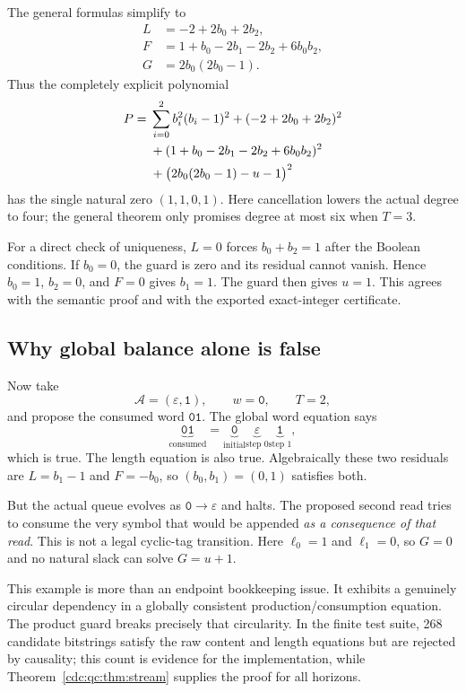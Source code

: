 \documentclass[11pt,a4paper]{article}
\theoremstyle{definition}
\theoremstyle{remark}
\newcommand{\eps}{\varepsilon}
\newcommand{\CT}{\mathcal A}
\newcommand{\word}[1]{\mathtt{#1}}
\begin{document}
The general formulas simplify to
\begin{align*}
 L&=-2+2b_0+2b_2,\\
 F&=1+b_0-2b_1-2b_2+6b_0b_2,\\
 G&=2b_0(2b_0-1).
\end{align*}
Thus the completely explicit polynomial
\begin{align}\label{cdc:qc:eq:small-example}
 P={}&\sum_{i=0}^{2}b_i^2(b_i-1)^2+(-2+2b_0+2b_2)^2\notag\\
 &+(1+b_0-2b_1-2b_2+6b_0b_2)^2\notag\\
 &+\bigl(2b_0(2b_0-1)-u-1\bigr)^2
\end{align}
has the single natural zero $(1,1,0,1)$. Here cancellation lowers the actual degree to four; the general theorem only promises degree at most six when $T=3$.

For a direct check of uniqueness, $L=0$ forces $b_0+b_2=1$ after the Boolean conditions. If $b_0=0$, the guard is zero and its residual cannot vanish. Hence $b_0=1$, $b_2=0$, and $F=0$ gives $b_1=1$. The guard then gives $u=1$. This agrees with the semantic proof and with the exported exact-integer certificate.

\subsection{Why global balance alone is false}
Now take
\[
 \CT=(\eps,\word{1}),\qquad w=\word{0},\qquad T=2,
\]
and propose the consumed word $\word{01}$. The global word equation says
\[
 \underbrace{\word{01}}_{\text{consumed}}
 =\underbrace{\word{0}}_{\text{initial}}
   \underbrace{\eps}_{\text{step 0}}
   \underbrace{\word{1}}_{\text{step 1}},
\]
which is true. The length equation is also true. Algebraically these two residuals are $L=b_1-1$ and $F=-b_0$, so $(b_0,b_1)=(0,1)$ satisfies both.

But the actual queue evolves as $\word{0}\to\eps$ and halts. The proposed second read tries to consume the very symbol that would be appended \emph{as a consequence of that read}. This is not a legal cyclic-tag transition. Here $\ell_0=1$ and $\ell_1=0$, so $G=0$ and no natural slack can solve $G=u+1$.

This example is more than an endpoint bookkeeping issue. It exhibits a genuinely circular dependency in a globally consistent production/consumption equation. The product guard breaks precisely that circularity. In the finite test suite, 268 candidate bitstrings satisfy the raw content and length equations but are rejected by causality; this count is evidence for the implementation, while Theorem~\ref{cdc:qc:thm:stream} supplies the proof for all horizons.
\end{document}
